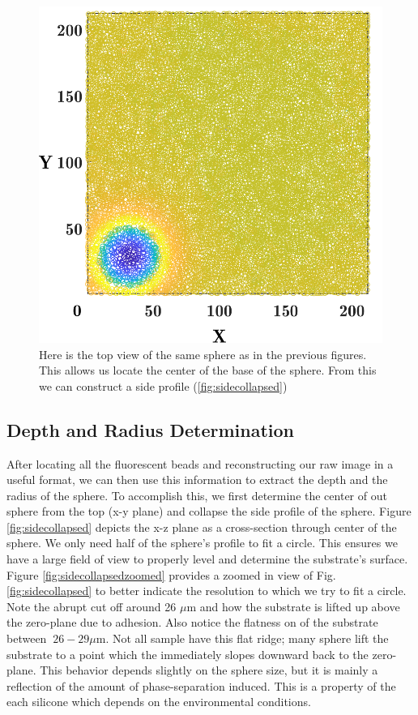 \begin{figure}[h]
	\centering
	\includegraphics[width=\linewidth]{Chapters/Figures/sphere011_ia/particle_located_top_view}
	\caption[Particle Located: Top View]{Here is the top view of the same sphere as in the previous figures. This allows us locate the center of the base of the sphere. From this we can construct a side profile (\ref{fig:sidecollapsed})}
	\label{fig:particlelocatedtopview}
\end{figure}
\subsection{Depth and Radius Determination}
After locating all the fluorescent beads and reconstructing our raw image in a useful format, we can then use this information to extract the depth and the radius of the sphere. To accomplish this, we first determine the center of out sphere from the top (x-y plane) and collapse the side profile of the  sphere. Figure \ref{fig:sidecollapsed} depicts the x-z plane as a cross-section through center of the sphere. We only need half of the sphere's profile to fit a circle. This ensures we have a large field of view to properly level and determine the substrate's surface. Figure \ref{fig:sidecollapsedzoomed} provides a zoomed in view of Fig. \ref{fig:sidecollapsed} to better indicate the resolution to which we try to fit a circle. Note the abrupt cut off around 26 $\mu$m and how the substrate is lifted up above the zero-plane due to adhesion. Also notice the flatness on of the substrate between $ ~26-29 \mu $m. Not all sample have this flat ridge; many sphere lift the substrate to a point which the immediately slopes downward back to the zero-plane. This behavior depends slightly on the sphere size, but it is mainly a reflection of the amount of phase-separation induced. This is a property of the each silicone which depends on the environmental conditions. 


